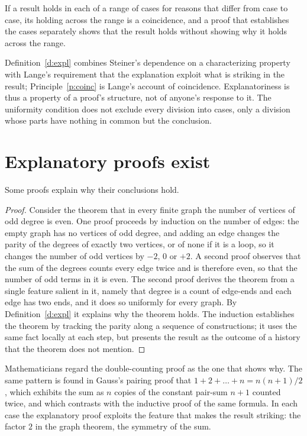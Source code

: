 \documentclass{situationist-preprint}
\begin{document}
\begin{principle}[Coincidence]\label{p:coinc}
If a result holds in each of a range of cases for reasons that differ from case to case, its holding across the range is a coincidence, and a proof that establishes the cases separately shows that the result holds without showing why it holds across the range.
\end{principle}

Definition~\ref{d:expl} combines Steiner's dependence on a characterizing property with Lange's requirement that the explanation exploit what is striking in the result; Principle~\ref{p:coinc} is Lange's account of coincidence. Explanatoriness is thus a property of a proof's structure, not of anyone's response to it. The uniformity condition does not exclude every division into cases, only a division whose parts have nothing in common but the conclusion.

\section{Explanatory proofs exist}

\begin{proposition}\label{p:exist}
Some proofs explain why their conclusions hold.
\end{proposition}

\begin{proof}
Consider the theorem that in every finite graph the number of vertices of odd degree is even. One proof proceeds by induction on the number of edges: the empty graph has no vertices of odd degree, and adding an edge changes the parity of the degrees of exactly two vertices, or of none if it is a loop, so it changes the number of odd vertices by $-2$, $0$ or $+2$. A second proof observes that the sum of the degrees counts every edge twice and is therefore even, so that the number of odd terms in it is even. The second proof derives the theorem from a single feature salient in it, namely that degree is a count of edge-ends and each edge has two ends, and it does so uniformly for every graph. By Definition~\ref{d:expl} it explains why the theorem holds. The induction establishes the theorem by tracking the parity along a sequence of constructions; it uses the same fact locally at each step, but presents the result as the outcome of a history that the theorem does not mention.
\end{proof}

Mathematicians regard the double-counting proof as the one that shows why. The same pattern is found in Gauss's pairing proof that $1 + 2 + \dots + n = n(n+1)/2$, which exhibits the sum as $n$ copies of the constant pair-sum $n+1$ counted twice, and which \citet{Lange2009} contrasts with the inductive proof of the same formula. In each case the explanatory proof exploits the feature that makes the result striking: the factor $2$ in the graph theorem, the symmetry of the sum.
\end{document}
